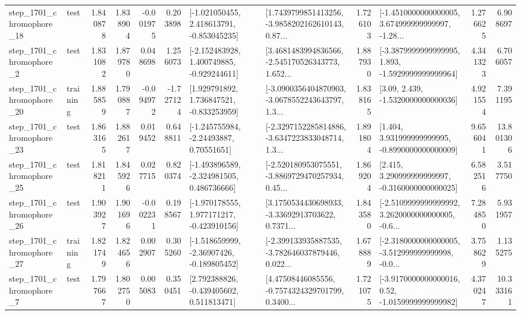 \begin{tabular}{llrrrrllrlrr}
 step\_1701\_chromophore\_18 &      test &      1.840878 &    1.838904 &     -0.001975 &  0.203898 &   [-1.021050455, 2.418613791, -0.853045235] &  [1.7439799851413256, -3.9858202162610143, 0.87... &       1.726103 &  [-1.4510000000000005, 3.674999999999997, -1.28... &            1.276625 &          6.908697 \\
  step\_1701\_chromophore\_2 &      test &      1.831082 &    1.879780 &      0.048698 &  1.256073 &   [-2.152483928, 1.400749885, -0.929244611] &  [3.4681483994836566, -2.545170526343773, 1.652... &       1.887930 &  [-3.3879999999999995, 1.893, -1.5929999999999964] &            4.341323 &          6.706057 \\
 step\_1701\_chromophore\_20 &  training &      1.885859 &    1.790887 &     -0.094972 & -1.727124 &    [1.929791892, 1.736847521, -0.833253959] &  [-3.0900356404870903, -3.0678552243643797, 1.3... &       1.838165 &                 [3.09, 2.439, -1.5320000000000036] &            4.921554 &          7.391195 \\
 step\_1701\_chromophore\_23 &      test &      1.863165 &    1.882617 &      0.019452 &  0.648811 &     [-1.245755984, -2.24493887, 0.70551651] &  [-2.3297152285814886, -3.6347223833048714, 1.3... &       1.891804 &    [1.404, 3.931999999999995, -0.8990000000000009] &            9.656041 &         13.801306 \\
 step\_1701\_chromophore\_25 &      test &      1.818211 &    1.845926 &      0.027715 &  0.820374 &   [-1.493896589, -2.324981505, 0.486736666] &  [-2.520180953075551, -3.8869729470257934, 0.45... &       1.869204 &    [2.415, 3.290999999999997, -0.3160000000000025] &            6.582516 &          3.517750 \\
 step\_1701\_chromophore\_26 &      test &      1.903927 &    1.901696 &     -0.002231 &  0.198567 &   [-1.970178555, 1.977171217, -0.423910156] &  [3.1750534430698933, -3.33692913703622, 0.7371... &       1.843580 &  [-2.5109999999999992, 3.2620000000000005, -0.6... &            7.284850 &          5.931957 \\
 step\_1701\_chromophore\_27 &  training &      1.821749 &    1.824656 &      0.002907 &  0.305260 &   [-1.518659999, -2.36907426, -0.189805452] &  [-2.399133935887535, -3.782646037879446, 0.022... &       1.678889 &  [-2.3180000000000005, -3.512999999999998, -0.0... &            3.758629 &          1.135275 \\
  step\_1701\_chromophore\_7 &      test &      1.797667 &    1.802750 &      0.005083 &  0.350451 &    [2.792388826, -0.439405602, 0.511813471] &  [4.47508446085556, -0.7574324329701799, 0.3400... &       1.721075 &   [-3.9170000000000016, 0.52, -1.0159999999999982] &            4.370247 &         10.333161 \\

\end{tabular}

